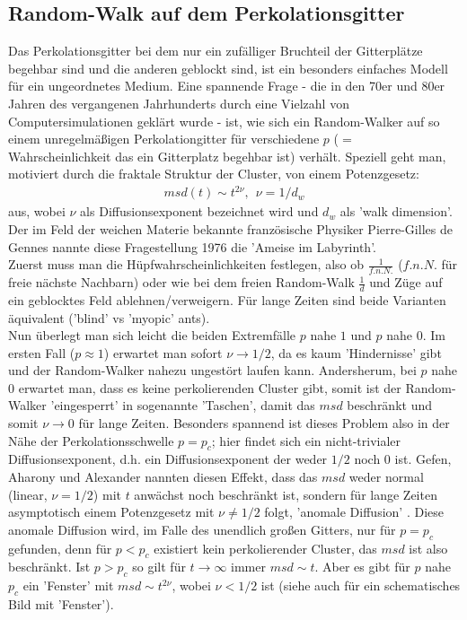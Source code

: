 \documentclass[a4paper, 12pt]{report}
\begin{document}
\subsection{Random-Walk auf dem Perkolationsgitter}
Das Perkolationsgitter bei dem nur ein zufälliger Bruchteil der Gitterplätze begehbar sind und die anderen geblockt sind, ist ein besonders einfaches Modell für ein ungeordnetes Medium. Eine spannende Frage - die in den 70er und 80er Jahren des vergangenen Jahrhunderts durch eine Vielzahl von Computersimulationen geklärt wurde - ist, wie sich ein Random-Walker auf so einem unregelmäßigen Perkolationgitter für verschiedene $p$ ($=$ Wahrscheinlichkeit das ein Gitterplatz begehbar ist) verhält. Speziell geht man, motiviert durch die fraktale Struktur der Cluster, von einem Potenzgesetz:
\begin{align}\label{powerlaw}
msd(t) \sim t^{2 \nu},\ \ \nu=1/d_w
\end{align} 
aus, wobei $\nu$ als Diffusionsexponent bezeichnet wird und $d_w$ als 'walk dimension'. Der im Feld der weichen Materie bekannte französische Physiker Pierre-Gilles de Gennes nannte diese Fragestellung 1976 die 'Ameise im Labyrinth'.\cite{Stauffer} 
\\ 
\noindent Zuerst muss man die Hüpfwahrscheinlichkeiten festlegen, also ob $\frac{1}{f.n.N.}$ ($f.n.N.$ für freie nächste Nachbarn) oder wie bei dem freien Random-Walk $\frac{1}{d}$ und Züge auf ein geblocktes Feld ablehnen/verweigern. Für lange Zeiten sind beide Varianten äquivalent ('blind' vs 'myopic' ants)\cite{Havlin}.
\\
Nun überlegt man sich leicht die beiden Extremfälle $p$ nahe $1$ und $p$ nahe $0$. Im ersten Fall ($p \approx 1$) erwartet man sofort $\nu \rightarrow1/2$, da es kaum 'Hindernisse' gibt und der Random-Walker nahezu ungestört laufen kann. Andersherum, bei $p$ nahe $0$ erwartet man, dass es keine perkolierenden Cluster gibt, somit ist der Random-Walker 'eingesperrt' in sogenannte 'Taschen', damit das $msd$ beschränkt und somit $\nu \rightarrow 0$ für lange Zeiten. Besonders spannend ist dieses Problem also in der Nähe der Perkolationsschwelle $p=p_c$; hier findet sich ein nicht-trivialer Diffusionsexponent, d.h. ein Diffusionsexponent der weder $1/2$ noch $0$ ist. Gefen, Aharony und Alexander nannten diesen Effekt, dass das $msd$ weder normal (linear, $\nu = 1/2$) mit $t$ anwächst noch beschränkt ist, sondern für lange Zeiten asymptotisch einem Potenzgesetz mit $\nu \neq 1/2$ folgt, 'anomale Diffusion' \cite{PhysRevLett.50.77}. Diese anomale Diffusion wird, im Falle des unendlich großen Gitters, nur für $p=p_c$ gefunden, denn für $p<p_c$ existiert kein perkolierender Cluster, das $msd$ ist also beschränkt. Ist $p > p_c$ so gilt für $t \rightarrow \infty $ immer $msd \sim t$. Aber es gibt für $p$ nahe $p_c$ ein 'Fenster' mit $msd \sim t^{2\nu}$, wobei $\nu < 1/2$ ist (siehe auch \cite{Kammerer_2008} für ein schematisches Bild mit 'Fenster').
\end{document}
